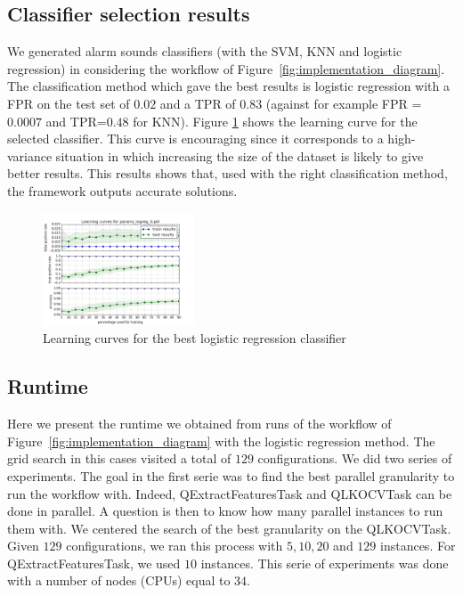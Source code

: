 \documentclass[10pt, conference, compsocconf]{IEEEtran}
\begin{document}
\subsection{Classifier selection results}
We generated alarm sounds classifiers (with the SVM, KNN and logistic regression) in considering the workflow of 
Figure~\ref{fig:implementation_diagram}. 
The classification method which gave the best results is logistic regression with a FPR on the test set of $0.02$ and a TPR of $0.83$ (against for example FPR = $0.0007$ and TPR=$0.48$ for KNN). Figure \ref{fig:learning_curve} shows the learning curve for the selected classifier. This curve is encouraging since it corresponds to a high-variance situation in which increasing the size of the dataset is likely to give better results. This results shows that, used with the right classification method, the framework outputs accurate solutions. 
\begin{figure}[h]
  \centering
  \includegraphics[width=0.4\textwidth]{Figures/learning_curve_logreg0_newdata.png}
  \caption{Learning curves for the best logistic regression classifier \label{fig:learning_curve}}
\end{figure}

\subsection{Runtime}
Here we present the runtime we obtained from runs of the workflow of Figure~\ref{fig:implementation_diagram} with the logistic 
regression method. The grid search in this cases visited a total of $129$ configurations. We did two series of experiments. 
The goal in the first serie was to find the best parallel granularity to run the workflow with. Indeed, 
QExtractFeaturesTask and QLKOCVTask can be done in parallel. A question is then to know how 
many parallel instances to run them with. We centered the search of the best granularity on the QLKOCVTask. 
Given $129$ configurations, we ran this process with $5, 10, 20$ and $129$ instances. For QExtractFeaturesTask,  
we used $10$ instances. This serie of experiments was done with a number of nodes (CPUs) equal to $34$. 
\end{document}

